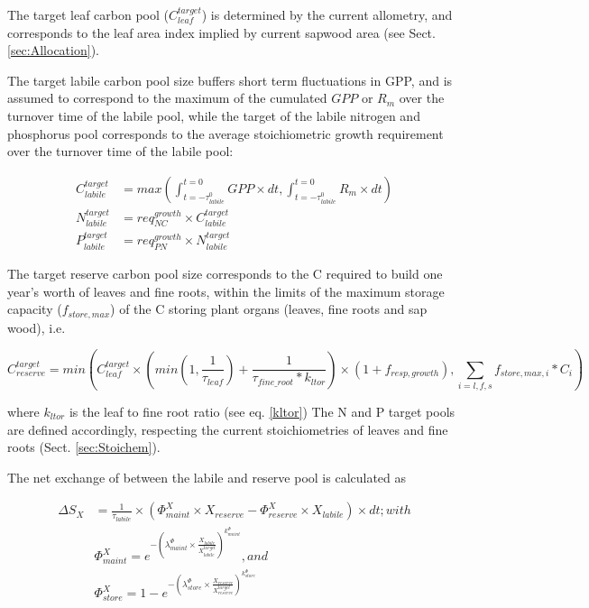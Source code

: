 The target leaf carbon pool ($C^{target}_{leaf}$) is determined by the current allometry, and corresponds to the leaf area index implied by current sapwood area (see Sect. \ref{sec:Allocation}).

The target labile carbon pool size buffers short term fluctuations in GPP, and is assumed to correspond to the maximum of the cumulated $GPP$ or $R_m$ over the turnover time of the labile pool, while the target of the labile nitrogen and phosphorus pool corresponds to the average stoichiometric growth requirement over the turnover time of the labile pool:

\begin{subequations}
\begin{align}
C^{target}_{labile} &= max(\int_{t=-{\tau^{0}_{labile}}}^{t=0} GPP \times dt, \int_{t=-{\tau^{0}_{labile}}}^{t=0} R_m\times dt) \\
N^{target}_{labile} &= req^{growth}_{NC} \times C^{target}_{labile}  \\
P^{target}_{labile} &= req^{growth}_{PN} \times N^{target}_{labile} 
\end{align} 
\end{subequations}

The target reserve carbon pool size corresponds to the C required to build one year's worth of leaves and fine roots, within the limits of the maximum storage capacity ($f_{store,max}$) of the C storing plant organs (leaves, fine roots and sap wood), i.e. 

\begin{equation}
C^{target}_{reserve} = min(C^{target}_{leaf} \times ( min(1,\frac{1}{\tau_{leaf}}) + \frac{1}{\tau_{fine\_root} * k_{ltor}} )  \times (1+f_{resp,growth}), \sum_{i=l,f,s} f_{store,max,i} * C_{i})
\end{equation}

where $k_{ltor}$ is the leaf to fine root ratio (see eq. \ref{kltor})  The N and P target pools are defined accordingly, respecting the current stoichiometries of leaves and fine roots (Sect. \ref{sec:Stoichem}).
 
The net exchange of between the labile and reserve pool is calculated as 

\begin{subequations}
\begin{align}
\Delta S_X &= \frac{1}{\tau_{labile}} \times (\Phi^{X}_{maint} \times X_{reserve} - \Phi^{X}_{reserve} \times X_{labile}) \times dt; with \\
&\Phi^{X}_{maint} = e^{-(\lambda^{\Phi}_{maint} \times \frac{X_{labile}}{X^{target}_{labile}})^{k^{\Phi}_{maint}}}, and \label{eq:veg:phimaint} \\
&\Phi^{X}_{store} = 1 - e^{-(\lambda^{\Phi}_{store} \times \frac{X_{reserve}}{X^{target}_{reserve}})^{k^{\Phi}_{store}}}\label{eq:veg:phistore}
\end{align}
\end{subequations}

